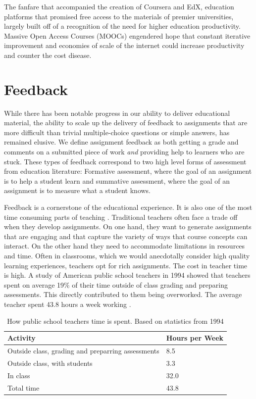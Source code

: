 The fanfare that accompanied the creation of Coursera and EdX, education platforms that promised free access to the materials of premier universities, largely built off of a recognition of the need for higher education productivity. Massive Open Access Courses (MOOCs) engendered hope that constant iterative
improvement and economies of scale of the internet could increase productivity and counter the cost disease.

\section{Feedback}

While there has been notable progress in our ability to deliver educational material, the ability to scale up the delivery of feedback to assignments that are more difficult than trivial multiple-choice questions or simple answers, has remained elusive. We define assignment feedback as both getting a grade and comments on a submitted piece of work \emph{and} providing help to learners who are stuck. These types of feedback correspond to two high level forms of assessment from education literature: Formative assessment, where the goal of an assignment is to help a student learn and summative assessment, where the goal of an assignment is to measure what a student knows.

Feedback is a cornerstone of the educational experience. It is also one of the most time consuming parts of teaching \cite{sadler2006impact}. Traditional teachers often face a trade off when they develop assignments. On one hand, they want to generate assignments that are engaging and that capture the variety of ways that course concepts can interact. On the other hand they need to accommodate limitations in resources and time. Often in classrooms, which we would anecdotally consider high quality learning experiences, teachers opt for rich assignments. The cost in teacher time is high. A study of American public school teachers in 1994 showed that teachers spent on average 19\% of their time outside of class grading and preparing assessments. This directly contributed to them being overworked. The average teacher spent 43.8 hours a week working \cite{henke1996schools}.

\begin{table}[t]
 \centering
 \begin{tabular}{ l l }
 \toprule
	Activity & Hours per Week \\
   \midrule
   Outside class, grading and preparring assessments & 8.5 \\
  Outside class, with students & 3.3 \\
  In class & 32.0 \\
  Total time & 43.8 \\
  \bottomrule
  \end{tabular}
  \caption[Teacher time]{How public school teachers time is spent. Based on statistics from 1994 \cite{henke1996schools}}
 \label{tab:dataTable}
\end{table}

